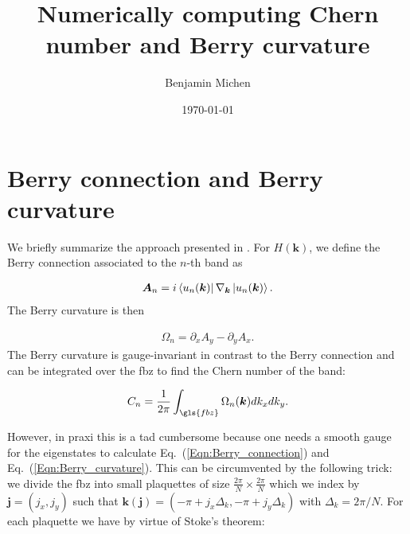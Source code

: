 \documentclass[english]{scrartcl}
\title{Numerically computing Chern number and Berry curvature}
\author{Benjamin Michen}
\date{\today}
\newcommand{\eq}[1]{Eq.~(\ref{#1})}
\begin{document}
\maketitle
{
\hypersetup{linkcolor=black}
\tableofcontents
}

\newpage

\section{Berry connection and Berry curvature}
We briefly summarize the approach presented in \cite{chern_number_notes}. For $H(\bm k)$, we define the Berry connection associated to the $n$-th band as

\begin{align}
\bm A_n = i \bra{u_n(\bm k)} \nabla_{\bm k} \ket{u_n(\bm k)}. \label{Eqn:Berry_connection}
\end{align}
The Berry curvature is then 

\begin{align}
\Omega_{n} = \partial_x A_y - \partial_y A_x. \label{Eqn:Berry_curvature}
\end{align}
The Berry curvature is gauge-invariant in contrast to the Berry connection and can be integrated over the \gls{fbz} to find the Chern number of the band:

\begin{align}
C_n = \frac{1}{2\pi} \int_{\gls{fbz}} \Omega_{n}(\bm k) d k_x d k_y. \label{Eqn:Chern_number}
\end{align}

However, in praxi this is a tad cumbersome because one needs a smooth gauge for the eigenstates to calculate \eq{Eqn:Berry_connection} and \eq{Eqn:Berry_curvature}. This can be circumvented by the following trick: we divide the \gls{fbz} into small plaquettes of size $\frac{2 \pi}{N} \times \frac{2 \pi}{N}$ which we index by $\bm j = (j_x, j_y)$ such that $\bm k(\bm j) = (-\pi + j_x \Delta_k, -\pi + j_y \Delta_k)$ with $\Delta_k = 2 \pi / N$. For each plaquette we have by virtue of Stoke's theorem:
\end{document}
